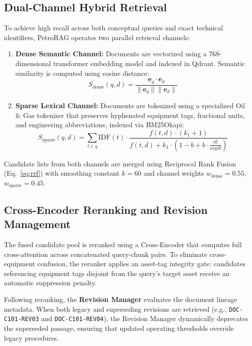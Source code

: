 \subsection{Dual-Channel Hybrid Retrieval}
To achieve high recall across both conceptual queries and exact technical identifiers, PetroRAG operates two parallel retrieval channels:
\begin{enumerate}
    \item \textbf{Dense Semantic Channel:} Documents are vectorized using a 768-dimensional transformer embedding model and indexed in Qdrant. Semantic similarity is computed using cosine distance:
    \begin{equation}
    S_{\text{dense}}(q, d) = \frac{\mathbf{e}_q \cdot \mathbf{e}_d}{\|\mathbf{e}_q\| \|\mathbf{e}_d\|}
    \end{equation}
    \item \textbf{Sparse Lexical Channel:} Documents are tokenized using a specialized Oil \& Gas tokenizer that preserves hyphenated equipment tags, fractional units, and engineering abbreviations, indexed via BM25Okapi:
    \begin{equation}
    S_{\text{sparse}}(q, d) = \sum_{t \in q} \text{IDF}(t) \cdot \frac{f(t, d) \cdot (k_1 + 1)}{f(t, d) + k_1 \cdot \left(1 - b + b \cdot \frac{|d|}{\text{avgdl}}\right)}
    \end{equation}
\end{enumerate}
Candidate lists from both channels are merged using Reciprocal Rank Fusion (Eq.~\ref{eq:rrf}) with smoothing constant $k=60$ and channel weights $w_{\text{dense}}=0.55$, $w_{\text{sparse}}=0.45$.

\subsection{Cross-Encoder Reranking and Revision Management}
The fused candidate pool is reranked using a Cross-Encoder that computes full cross-attention across concatenated query-chunk pairs. To eliminate cross-equipment confusion, the reranker applies an asset-tag integrity gate: candidates referencing equipment tags disjoint from the query's target asset receive an automatic suppression penalty.

Following reranking, the \textbf{Revision Manager} evaluates the document lineage metadata. When both legacy and superseding revisions are retrieved (e.g., \texttt{DOC-C101-REV03} and \texttt{DOC-C101-REV04}), the Revision Manager dynamically deprecates the superseded passage, ensuring that updated operating thresholds override legacy procedures.

